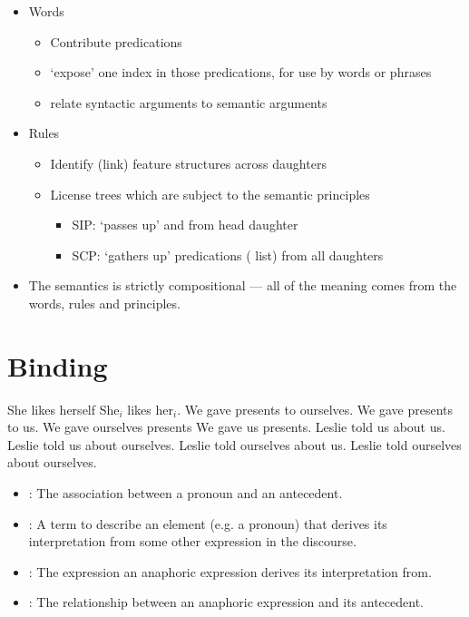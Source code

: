 \documentclass[a4paper,landscape,headrule,footrule]{foils}
\begin{document}
\MyLogo{}
\begin{itemize}
\item Words
  \begin{itemize}
  \item Contribute predications
  \item ‘expose’ one index in those predications, for use by words or phrases
  \item relate syntactic arguments to semantic arguments
  \end{itemize}
\item Rules
\begin{itemize}
\item Identify (link) feature structures across daughters
\item License trees which are subject to the semantic principles
  \begin{itemize}
  \item SIP: ‘passes up’  and  from head daughter
  \item SCP: ‘gathers up’ predications ( list) from all daughters
  \end{itemize}
\end{itemize}
\item The semantics is strictly compositional --- all of the meaning
  comes from the words, rules and principles.
\end{itemize}

\section{Binding}



\begin{exe}
\ix She likes herself
\ix *She$_i$ likes her$_i$.
\ix We gave presents to ourselves.
\ix *We gave presents to us.
\ix We gave ourselves presents
\ix *We gave us presents.
\ix *Leslie told us about us.
\ix Leslie told us about ourselves.
\ix *Leslie told ourselves about us.
\ix *Leslie told ourselves about ourselves.
\end{exe}

\begin{itemize}
\item {}: The association between a pronoun
and an antecedent.
\item {}: A term to describe an element (e.g.
a pronoun) that derives its interpretation from
some other expression in the discourse.
\item {}: The expression an anaphoric
expression derives its interpretation from.
\item {}: The relationship between an
anaphoric expression and its antecedent.
\end{itemize}
\end{document}
